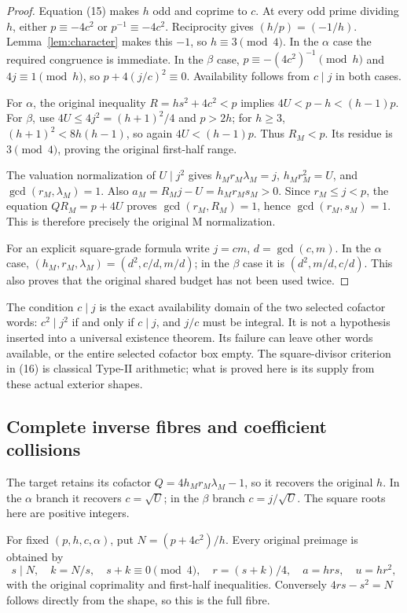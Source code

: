 \begin{proof}
Equation (15) makes $h$ odd and coprime to $c$. At every odd prime dividing $h$,
either $p\equiv-4c^2$ or $p^{-1}\equiv-4c^2$. Reciprocity gives
$(h/p)=(-1/h)$. Lemma~\ref{lem:character} makes this $-1$, so $h\equiv3\pmod4$.
In the $\alpha$ case the required congruence is immediate.
In the $\beta$ case, $p\equiv-(4c^2)^{-1}\pmod h$ and $4j\equiv1\pmod h$,
so $p+4(j/c)^2\equiv0$. Availability follows from $c\mid j$ in both cases.

For $\alpha$, the original inequality $R=hs^2+4c^2<p$ implies
$4U<p-h<(h-1)p$. For $\beta$, use
$4U\le4j^2=(h+1)^2/4$ and $p>2h$; for $h\ge3$,
$(h+1)^2<8h(h-1)$, so again $4U<(h-1)p$.
Thus $R_M<p$. Its residue is $3\pmod4$, proving the original first-half range.

The valuation normalization of $U\mid j^2$ gives $h_Mr_M\lambda_M=j$,
$h_Mr_M^2=U$, and $\gcd(r_M,\lambda_M)=1$. Also
$a_M=R_Mj-U=h_Mr_Ms_M>0$.
Since $r_M\le j<p$, the equation $QR_M=p+4U$ proves
$\gcd(r_M,R_M)=1$, hence $\gcd(r_M,s_M)=1$.
This is therefore precisely the original M normalization.

For an explicit square-grade formula write $j=cm$, $d=\gcd(c,m)$.
In the $\alpha$ case,
$(h_M,r_M,\lambda_M)=(d^2,c/d,m/d)$; in the $\beta$ case it is
$(d^2,m/d,c/d)$. This also proves that the original shared budget has not been
used twice.
\end{proof}

The condition $c\mid j$ is the exact availability domain of the two selected
cofactor words: $c^2\mid j^2$ if and only if $c\mid j$, and $j/c$ must be integral.
It is not a hypothesis inserted into a universal existence theorem. Its failure
can leave other words available, or the entire selected cofactor box empty.
The square-divisor criterion in (16) is classical Type-II arithmetic; what is
proved here is its supply from these actual exterior shapes.

\subsection{Complete inverse fibres and coefficient collisions}
The target retains its cofactor $Q=4h_Mr_M\lambda_M-1$, so it recovers the
original $h$. In the $\alpha$ branch it recovers $c=\sqrt U$; in the $\beta$
branch $c=j/\sqrt U$. The square roots here are positive integers.

For fixed $(p,h,c,\alpha)$, put $N=(p+4c^2)/h$. Every original preimage is
obtained by
\[
 s\mid N,\quad k=N/s,\quad s+k\equiv0\pmod4,\quad r=(s+k)/4,
 \quad a=hrs,\quad u=hr^2,
\]
with the original coprimality and first-half inequalities. Conversely
$4rs-s^2=N$ follows directly from the shape, so this is the full fibre.

